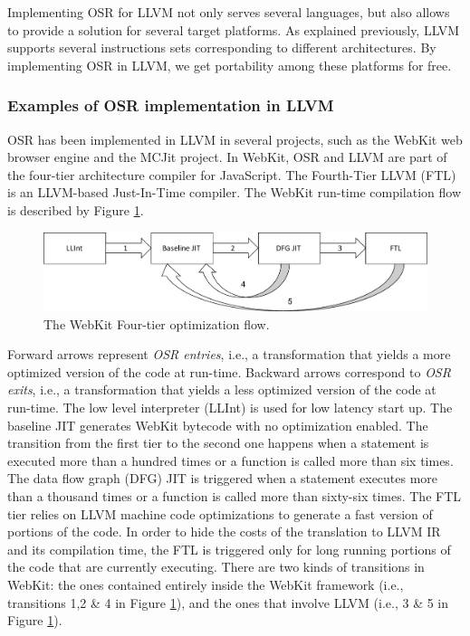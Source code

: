 Implementing OSR for LLVM not only serves several languages, but also allows to provide a solution for several target platforms.
As explained previously, LLVM supports several instructions sets corresponding to different architectures.
By implementing OSR in LLVM, we get portability among these platforms for free.\\


\subsubsection{Examples of OSR implementation in LLVM}

OSR has been implemented in LLVM in several projects, such as the WebKit web browser engine and the MCJit project.
In WebKit, OSR and LLVM are part of the four-tier architecture compiler for JavaScript.
The Fourth-Tier LLVM (FTL) is an LLVM-based Just-In-Time compiler.
The WebKit run-time compilation flow is described by Figure \ref{FTL}.\\
\begin{figure}[h]
\centering
\includegraphics[scale=0.5]{Figures/FTL}
\decoRule
\caption[The WebKit FTL]{The WebKit Four-tier optimization flow.}
\label{FTL}
\end{figure}
 
Forward arrows represent \textit{OSR entries}, i.e., a transformation that yields a more optimized version of the code at run-time.
Backward arrows correspond to \textit{OSR exits}, i.e., a transformation that yields a less optimized version of the code at run-time.
The low level interpreter (LLInt) is used for low latency start up.
The baseline JIT generates WebKit bytecode with no optimization enabled.
The transition from the first tier to the second one happens when a statement is executed more than a hundred times or a function is called more than six times.
The data flow graph (DFG) JIT is triggered when a statement executes more than a thousand times or a function is called more than sixty-six times.
The FTL tier relies on LLVM machine code optimizations to generate a fast version of portions of the code.
In order to hide the costs of the translation to LLVM IR and its compilation time, the FTL is triggered only for long running portions of the code that are currently executing.
There are two kinds of transitions in WebKit: the ones contained entirely inside the WebKit framework (i.e., transitions 1,2 \& 4 in Figure \ref{FTL}), and the ones that involve LLVM (i.e., 3 \& 5 in Figure \ref{FTL}).\\

